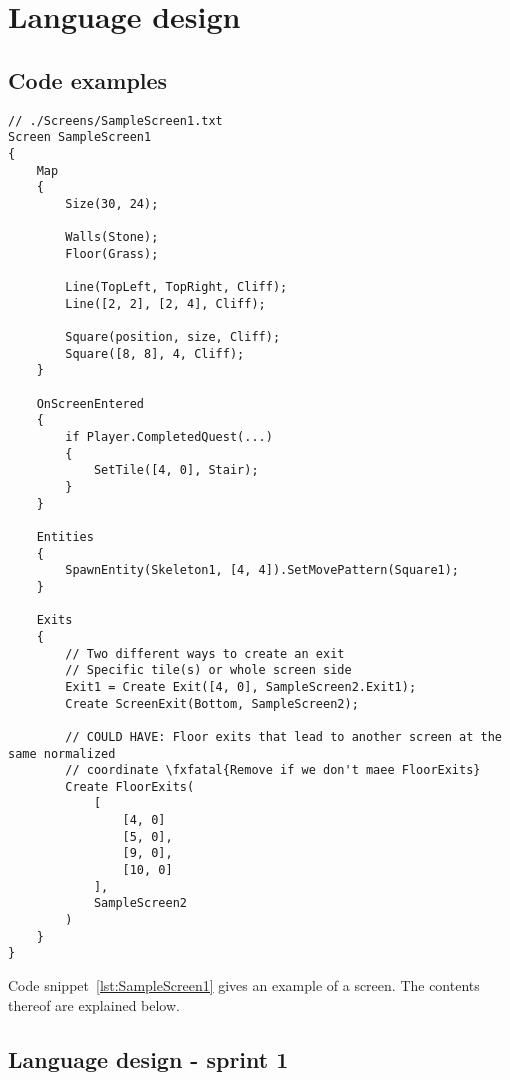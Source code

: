 \chapter{Language design}


\section{Code examples}

\begin{lstlisting}[caption={Example screen}, label={lst:SampleScreen1},escapechar=|]
// ./Screens/SampleScreen1.txt
Screen SampleScreen1 
{
    Map 
    {
        Size(30, 24);

        Walls(Stone); 
        Floor(Grass);

        Line(TopLeft, TopRight, Cliff);
        Line([2, 2], [2, 4], Cliff);

        Square(position, size, Cliff);
        Square([8, 8], 4, Cliff);
    }

    OnScreenEntered
    {
        if Player.CompletedQuest(...) 
        {
            SetTile([4, 0], Stair);
        }
    }

    Entities
    {
        SpawnEntity(Skeleton1, [4, 4]).SetMovePattern(Square1);
    }
    
    Exits 
    {
        // Two different ways to create an exit
        // Specific tile(s) or whole screen side
        Exit1 = Create Exit([4, 0], SampleScreen2.Exit1);
        Create ScreenExit(Bottom, SampleScreen2);
    
        // COULD HAVE: Floor exits that lead to another screen at the same normalized 
        // coordinate \fxfatal{Remove if we don't maee FloorExits}
        Create FloorExits(  
            [ 
                [4, 0] 
                [5, 0], 
                [9, 0], 
                [10, 0] 
            ],
            SampleScreen2
        )
    }
}
\end{lstlisting}

Code snippet~\ref{lst:SampleScreen1} gives an example of a screen. The contents thereof are explained below.

\section{Language design - sprint 1}

